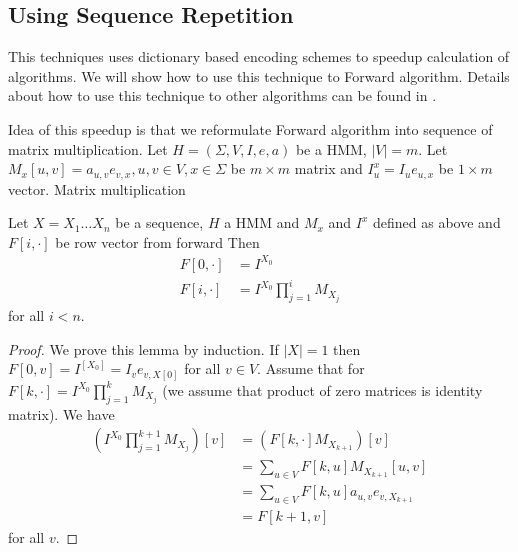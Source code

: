 




\subsection{Using Sequence Repetition}

This techniques uses dictionary based encoding schemes to speedup calculation of
algorithms. We will show how to use this technique to Forward algorithm. Details
about how to use this technique to other algorithms can be found in
\cite{Lifshits2009}.


Idea of this speedup is that we reformulate Forward algorithm into sequence of
matrix multiplication.
Let $H=(\Sigma,V,I,e,a)$ be a HMM, $|V|=m$.  Let $M_x[u,v]=a_{u,v}e_{v,x},
u,v\in V,x\in \Sigma$ be $m\times m$ matrix and $I^x_u=I_ue_{u,x}$ be
$1\times m$ vector. Matrix multiplication

\begin{lemma}\label{LEMA:MATRIXMULTI}
Let $X=X_1\dots X_n$ be a sequence, $H$ a HMM and $M_x$ and $I^x$ defined as above and
$F[i,\cdot]$ be row vector from forward
Then
\begin{align}
F[0,\cdot] &= I^{X_0}\\
F[i,\cdot] &= I^{X_0}\prod_{j=1}^i M_{X_j}
\end{align}
for all $i< n$.
\end{lemma}

\begin{proof}
We prove this lemma by induction.  If $|X|=1$ then
$F[0,v]=I^[X_0]=I_{v}e_{v,X[0]}$ for all $v\in V$.  Assume that for
$F[k,\cdot] = I^{X_0}\prod_{j=1}^k M_{X_j}$ (we assume that product of zero matrices
is identity matrix). We have 
\begin{align*}
\left(I^{X_0}\prod_{j=1}^{k+1} M_{X_j}\right)[v] &= 
\left(F[k,\cdot] M_{X_{k+1}}\right)[v]\\ &= \sum_{u\in V} F[k,u]
M_{X_{k+1}}[u,v]\\ &= \sum_{u\in V} F[k,u] a_{u,v}e_{v,X_{k+1} } \\&= F[k+1,v] 
\end{align*}
for all $v$. 
\end{proof}

